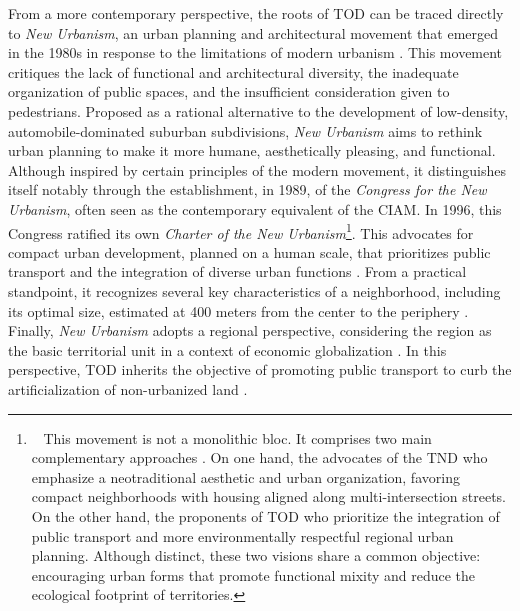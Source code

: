 \begin{refsegment}
From a more contemporary perspective, the roots of \acrshort{TOD} can be traced directly to \textsl{New Urbanism}, an urban planning and architectural movement that emerged in the 1980s in response to the limitations of modern urbanism \textcolor{blue}{\autocite[71]{liu_analyse_2016}}. This movement critiques the lack of functional and architectural diversity, the inadequate organization of public spaces, and the insufficient consideration given to pedestrians. Proposed as a rational alternative to the development of low-density, automobile-dominated suburban subdivisions, \textsl{New Urbanism} aims to rethink urban planning to make it more humane, aesthetically pleasing, and functional. Although inspired by certain principles of the modern movement, it distinguishes itself notably through the establishment, in 1989, of the \textsl{Congress for the New Urbanism}, often seen as the contemporary equivalent of the \acrfull{CIAM}. In 1996, this Congress ratified its own \textsl{Charter of the New Urbanism}\footnote{~
    This movement is not a monolithic bloc. It comprises two main complementary approaches \textcolor{blue}{\autocite[178]{ouellet_smart_2006}}. On one hand, the advocates of the \acrfull{TND} who emphasize a neotraditional aesthetic and urban organization, favoring compact neighborhoods with housing aligned along multi-intersection streets. On the other hand, the proponents of \acrshort{TOD} who prioritize the integration of public transport and more environmentally respectful regional urban planning. Although distinct, these two visions share a common objective: encouraging urban forms that promote functional mixity and reduce the ecological footprint of territories.
}. This  advocates for compact urban development, planned on a human scale, that prioritizes public transport and the integration of diverse urban functions \textcolor{blue}{\autocite[177]{ouellet_smart_2006}}. From a practical standpoint, it recognizes several key characteristics of a neighborhood, including its optimal size, estimated at 400 meters from the center to the periphery \textcolor{blue}{\autocite[194]{ducharme_ville_2021}}. Finally, \textsl{New Urbanism} adopts a regional perspective, considering the region as the basic territorial unit in a context of economic globalization \textcolor{blue}{\autocite[]{calthorpe_regional_2001}}. In this perspective, \acrshort{TOD} inherits the objective of promoting public transport to curb the artificialization of non-urbanized land \textcolor{blue}{\autocite[117]{lo_feudo_scenario_2014}}.%


\end{refsegment}
